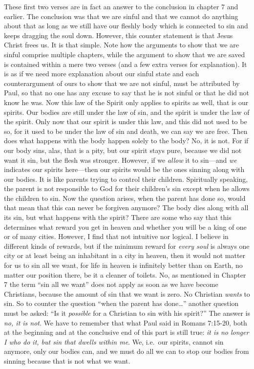 These first two verses are in fact an answer to the conclusion in
chapter 7 and earlier. The conclusion was that we are sinful and that we
cannot do anything about that as long as we still have our fleshly body
which is connected to sin and keeps dragging the soul down. However,
this counter statement is that Jesus Christ frees us. It is that simple.
Note how the arguments to show that we are sinful comprise multiple
chapters, while the argument to show that we are saved is contained
within a mere two verses (and a few extra verses for explanation). It is
as if we need more explanation about our sinful state and each
counterargument of ours to show that we are not sinful, must be
attributed by Paul, so that no one has any excuse to say that he is not
sinful or that he did not know he was. Now this law of the Spirit only
applies to spirits as well, that is our spirits. Our bodies are still
under the law of sin, and the spirit is under the law of the spirit.
Only now that our spirit is under this law, and this did not used to be
so, for it used to be under the law of sin and death, we can say we are
free. Then does what happens with the body happen solely to the body?
No, it is not. For if our body sins, alas, that is a pity, but our
spirit stays pure, because we did not want it sin, but the flesh was
stronger. However, if we \emph{allow} it to sin---and \emph{we}
indicates our spirits here---then our spirits would be the ones sinning
along with our bodies. It is like parents trying to control their
children. Spiritually speaking, the parent is not responsible to God for
their children's sin except when he allows the children to sin. Now the
question arises, when the parent has done so, would that mean that this
can never be forgiven anymore? The body dies along with all its sin, but
what happens with the spirit? There are some who say that this
determines what reward you get in heaven and whether you will be a king
of one or of many cities. However, I find that not intuitive nor
logical. I believe in different kinds of rewards, but if the minimum
reward for \emph{every soul} is always one city or at least being an
inhabitant in a city in heaven, then it would not matter for us to sin
all we want, for life in heaven is infinitely better than on Earth, no
matter our position there, be it a cleaner of toilets. No, as mentioned
in Chapter 7 the term ``sin all we want'' does not apply as soon as we
have become Christians, because the amount of sin that we want is zero.
No Christian \emph{wants} to sin. So to counter the question ``when the
parent has done\ldots{}'' another question must be asked: ``Is it
\emph{possible} for a Christian to sin with his spirit?'' The answer is
\emph{no, it is not}. We have to remember that what Paul said in Romans
7:15-20, both at the beginning and at the conclusive end of this part is
still true: \emph{it is no longer I who do it, but sin that dwells
within me}. We, i.e.~our spirits, cannot sin anymore, only our bodies
can, and we must do all we can to stop our bodies from sinning because
that is not what we want.

